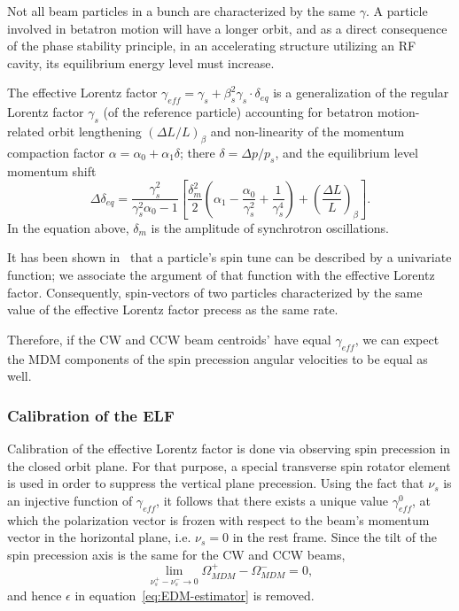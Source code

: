 \documentclass[a4paper]{jpconf}
\newcommand{\W}{\Omega}
\newcommand{\geff}{\gamma_{eff}}
\begin{document}
Not all beam particles in a bunch are characterized by the same $\gamma$. A particle involved in betatron
motion will have a longer orbit, and as a direct consequence of the phase stability principle,
in an accelerating structure utilizing an RF cavity, its equilibrium energy level 
must increase.

The effective Lorentz factor $\geff = \gamma_s + \beta_s^2\gamma_s\cdot\delta_{eq}$ is a generalization of the regular Lorentz factor $\gamma_s$ (of the reference particle) accounting for betatron motion-related orbit lengthening $(\Delta L/L)_\beta$ and non-linearity of the momentum compaction factor $\alpha = \alpha_0 + \alpha_1\delta$; there $\delta=\Delta p/p_s$, and the equilibrium level momentum shift~\cite{Senichev:FDM, Senichev:IPAC13}
\begin{equation*}\label{eq:equ-delta-shift}
	\Delta\delta_{eq} = \frac{\gamma_s^2}{\gamma_s^2\alpha_0-1}\left[\frac{\delta_m^2}{2}\left(\alpha_1 - \frac{\alpha_0}{\gamma_s^2}+ \frac{1}{\gamma_s^4}\right) + \left(\frac{\Delta L}{L}\right)_\beta\right].
\end{equation*}
In the equation above, $\delta_m$ is the amplitude of synchrotron oscillations.

It has been shown in~\cite[p.~56]{Aksentev:Thesis} that a particle's spin tune can be described by a univariate function; we associate the argument of that function with the effective Lorentz factor. Consequently, spin-vectors of two particles characterized by the same value of the effective Lorentz factor precess as the same rate.

Therefore, if the CW and CCW beam centroids' have equal $\geff$, we can expect the MDM components of the spin precession angular velocities to be equal as well.

\subsubsection{Calibration of the ELF}
Calibration of the effective Lorentz factor is done via observing spin precession in the closed orbit plane. For that purpose, a special transverse spin rotator element is used in order to suppress the vertical plane precession.  Using the fact that $\nu_s$ is an injective function of $\geff$, it follows that there exists a unique value $\geff^0$, at which the polarization vector is frozen with respect to the beam's momentum vector in the horizontal plane, i.e. $\nu_s=0$ in the rest frame. Since the tilt of the spin precession axis is the same for the CW and CCW beams,  
\[
\lim_{\nu_s^+ - \nu_s^- \to 0} \W_{MDM}^+ - \W_{MDM}^- = 0,
\]
and hence $\epsilon$ in equation~\eqref{eq:EDM-estimator} is removed.
\end{document}
